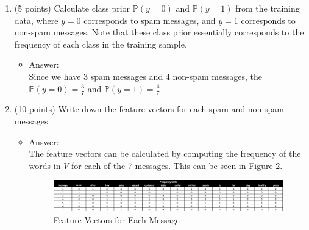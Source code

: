 \documentclass[twoside,10pt]{article}
\begin{document}
\begin{enumerate}
\begin{enumerate}
\item (5 points) Calculate class prior $\mathbb P(y = 0)$ and $\mathbb P(y = 1)$ from the training data, where $y = 0$ corresponds to spam messages, and $y = 1$ corresponds to non-spam messages. Note that these class prior essentially corresponds to the frequency of each class in the training sample. 
\begin{itemize}
\item Answer:\\
Since we have 3 spam messages and 4 non-spam messages, the $\mathbb P(y = 0)= \frac{3}{7}$ and  $\mathbb P(y = 1) = \frac{4}{7}$
\end{itemize}
\item (10 points) Write down the feature vectors for each spam and non-spam messages.
\begin{itemize}
\item Answer:\\
The feature vectors can be calculated by computing the frequency of the words in $V$ for each of the 7 messages. This can be seen in Figure 2.

\begin{figure}[h!]
\begin{center}
\includegraphics[totalheight=0.8in]{Q3bFrequencyTable.png}
\end{center}
\caption{Feature Vectors for Each Message}
\end{figure}

\end{itemize}


\end{enumerate}
\end{enumerate}
\end{document}
